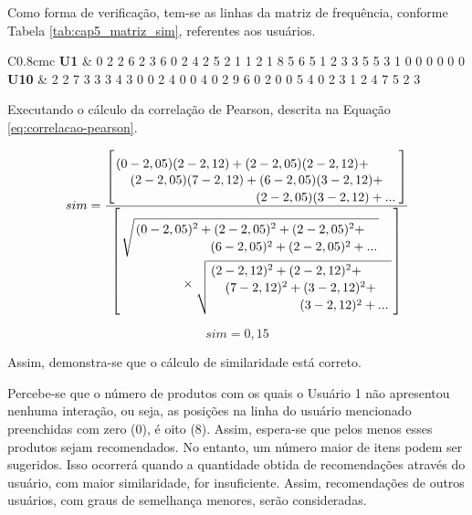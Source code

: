 Como forma de verificação, tem-se as linhas da matriz de frequência, conforme Tabela \ref{tab:cap5_matriz_sim}, referentes aos usuários.


\begin{table}[htb]
\caption{Matriz de similaridade}
\label{tab:cap5_matriz_sim}
\begin{tabular}{C{0.8cm}c}
\toprule
\textbf{U1} & 0 2  2  6  2  3  6  0  2  4  2  5  2  1  1  2  1  8  5  6  5  1  2  3  3  5  5  3  1  0  0  0  0  0  0 \\ \midrule
\textbf{U10} & 2  2  7  3  3  3  4  3  0  0  2  4  0  0  4  0  2  9  6  0  2  0  0  5  4  0  2  3  1  2  4  7  5  2  3 \\ \bottomrule
\end{tabular}
\end{table}        

Executando o cálculo da correlação de Pearson, descrita na Equação \ref{eq:correlacao-pearson}.

\begin{equation}
sim=\dfrac{\left[
\splitdfrac{
(0-2,05)(2-2,12)+
(2-2,05)(2-2,12)+
}
{\splitdfrac{
(2-2,05)(7-2,12)+
(6-2,05)(3-2,12)+
}{
(2-2,05)(3-2,12)+...}}\right]}
{
\left[
\splitdfrac{
\sqrt{\splitdfrac{(0-2,05)^2+
(2-2,05)^2+
(2-2,05)^2+
}{
(6-2,05)^2+
(2-2,05)^2+...}}
}{
\times\sqrt{\splitdfrac{(2-2,12)^2+
(2-2,12)^2+}{\splitdfrac{
(7-2,12)^2+
(3-2,12)^2+
}{
(3-2,12)^2+...}}}
}\right]
}
\nonumber
\end{equation}

\begin{equation}
sim = 0,15 \nonumber
\end{equation}

Assim, demonstra-se que o cálculo de similaridade está correto.

Percebe-se que o número de produtos com os quais o Usuário 1 não apresentou nenhuma interação, ou seja, as posições na linha do usuário mencionado preenchidas com zero (0), é oito (8). Assim, espera-se que pelos menos esses produtos sejam recomendados. 
No entanto, um número maior de itens podem ser sugeridos. Isso ocorrerá quando a quantidade obtida de recomendações através do usuário, com maior similaridade, for insuficiente. Assim, recomendações de outros usuários, com graus de semelhança menores, serão consideradas.

